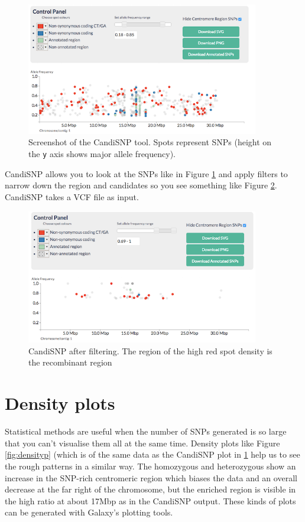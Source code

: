 \documentclass[12pt,]{book}
\begin{document}
\begin{figure}
\includegraphics[width=4in]{assets/candisnp} \caption{Screenshot of the CandiSNP tool. Spots represent SNPs
(height on the \texttt{y} axis shows major allele frequency).}\label{fig:csnpb4}
\end{figure}

CandiSNP allows you to look at the SNPs like in Figure \ref{fig:csnpb4}
and apply filters to narrow down the region and candidates so you see
something like Figure \ref{fig:csnp}. CandiSNP takes a VCF file as
input.




\begin{figure}
\includegraphics[width=4in]{assets/candisnp_after} \caption{CandiSNP after filtering. The region of the high red
spot density is the recombinant region}\label{fig:csnp}
\end{figure}

\section{Density plots}\label{density-plots}

Statistical methods are useful when the number of SNPs generated is so
large that you can't visualise them all at the same time. Density plots
like Figure \ref{fig:densityp} (which is of the same data as the
CandiSNP plot in \ref{fig:csnpb4} help us to see the rough patterns in a
similar way. The homozygous and heterozygous show an increase in the
SNP-rich centromeric region which biases the data and an overall
decrease at the far right of the chromosome, but the enriched region is
visible in the high ratio at about 17Mbp as in the CandiSNP output.
These kinds of plots can be generated with Galaxy's plotting tools.
\end{document}
